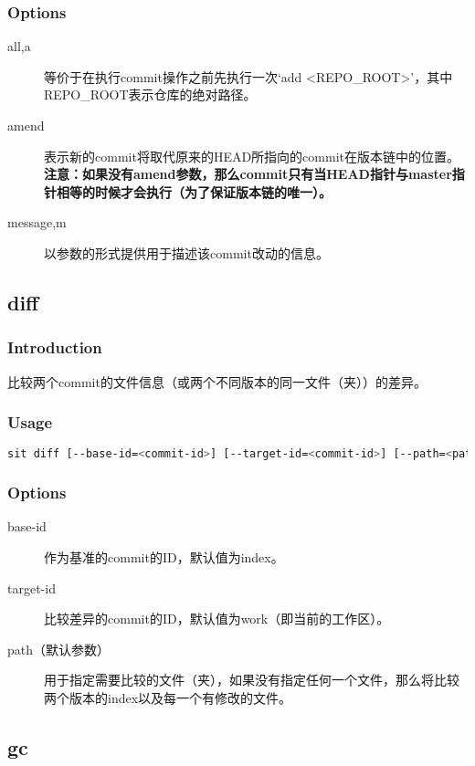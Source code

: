 \subsubsection*{Options}
\begin{description}
	\item[\YaHeiMono all,a] 等价于在执行commit操作之前先执行一次`add <REPO\_ROOT>'，其中REPO\_ROOT表示仓库的绝对路径。
	\item[\YaHeiMono amend] 表示新的commit将取代原来的HEAD所指向的commit在版本链中的位置。\\\textbf{注意：如果没有amend参数，那么commit只有当HEAD指针与master指针相等的时候才会执行（为了保证版本链的唯一）。}
	\item[\YaHeiMono message,m] 以参数的形式提供用于描述该commit改动的信息。
\end{description}

\subsection{diff}
\subsubsection*{Introduction}
比较两个commit的文件信息（或两个不同版本的同一文件（夹））的差异。
\subsubsection*{Usage}
\begin{lstlisting}[language=sh]
sit diff [--base-id=<commit-id>] [--target-id=<commit-id>] [--path=<path> ...]
\end{lstlisting}
\subsubsection*{Options}
\begin{description}
	\item[\YaHeiMono base-id] 作为基准的commit的ID，默认值为index。
	\item[\YaHeiMono target-id] 比较差异的commit的ID，默认值为work（即当前的工作区）。
	\item[\YaHeiMono path（默认参数）] 用于指定需要比较的文件（夹），如果没有指定任何一个文件，那么将比较两个版本的index以及每一个有修改的文件。
\end{description}

\subsection{gc}
